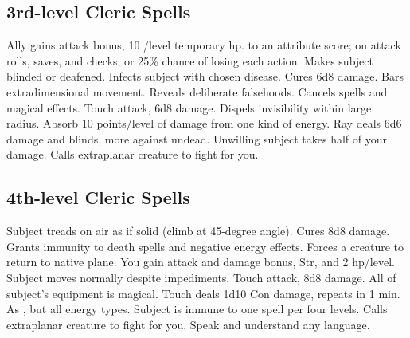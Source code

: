 \subsection{3rd-level Cleric Spells}
\begin{spelllist}
 Ally gains  attack bonus, 10 /level temporary hp.
  to an attribute score;  on attack rolls, saves, and checks; or 25\% chance of losing each action.
 Makes subject blinded or deafened.
 Infects subject with chosen disease.
 Cures 6d8 damage.
 Bars extradimensional movement.
 Reveals deliberate falsehoods.
 Cancels spells and magical effects.
 Touch attack, 6d8 damage.
 Dispels invisibility within large radius.
 Absorb 10 points/level of damage from one kind of energy.
 Ray deals 6d6 damage and blinds, more against undead.
 Unwilling subject takes half of your damage.
 Calls extraplanar creature to fight for you.
\end{spelllist}

\subsection{4th-level Cleric Spells}
\begin{spelllist}
 Subject treads on air as if solid (climb at 45-degree angle).
 Cures 8d8 damage.
 Grants immunity to death spells and negative energy effects.
 Forces a creature to return to native plane.
 You gain attack and damage bonus,  Str, and 2 hp/level.
 Subject moves normally despite impediments.
 Touch attack, 8d8 damage.
 All of subject's equipment is magical.
 Touch deals 1d10 Con damage, repeats in 1 min.
 As , but all energy types.
 Subject is immune to one spell per four levels.
 Calls extraplanar creature to fight for you.
 Speak and understand any language.
\end{spelllist}

